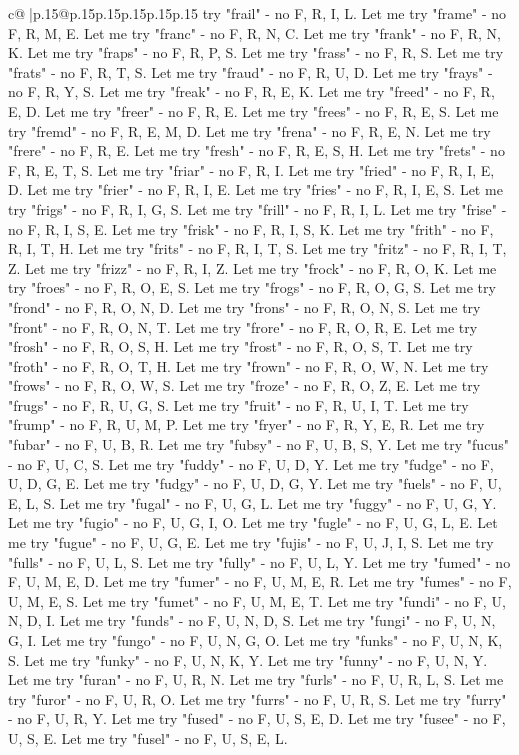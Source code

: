 \documentclass{article}
\begin{document}
{\begin{supertabular}{c@{$\;$}|p{.15\linewidth}@{}p{.15\linewidth}p{.15\linewidth}p{.15\linewidth}p{.15\linewidth}p{.15\linewidth}}
{{{try "frail" {-} no F, R, I, L. Let me try "frame" {-} no F, R, M, E. Let me try "franc" {-} no F, R, N, C. Let me try "frank" {-} no F, R, N, K. Let me try "fraps" {-} no F, R, P, S. Let me try "frass" {-} no F, R, S. Let me try "frats" {-} no F, R, T, S. Let me try "fraud" {-} no F, R, U, D. Let me try "frays" {-} no F, R, Y, S. Let me try "freak" {-} no F, R, E, K. Let me try "freed" {-} no F, R, E, D. Let me try "freer" {-} no F, R, E. Let me try "frees" {-} no F, R, E, S. Let me try "fremd" {-} no F, R, E, M, D. Let me try "frena" {-} no F, R, E, N. Let me try "frere" {-} no F, R, E. Let me try "fresh" {-} no F, R, E, S, H. Let me try "frets" {-} no F, R, E, T, S. Let me try "friar" {-} no F, R, I. Let me try "fried" {-} no F, R, I, E, D. Let me try "frier" {-} no F, R, I, E. Let me try "fries" {-} no F, R, I, E, S. Let me try "frigs" {-} no F, R, I, G, S. Let me try "frill" {-} no F, R, I, L. Let me try "frise" {-} no F, R, I, S, E. Let me try "frisk" {-} no F, R, I, S, K. Let me try "frith" {-} no F, R, I, T, H. Let me try "frits" {-} no F, R, I, T, S. Let me try "fritz" {-} no F, R, I, T, Z. Let me try "frizz" {-} no F, R, I, Z. Let me try "frock" {-} no F, R, O, K. Let me try "froes" {-} no F, R, O, E, S. Let me try "frogs" {-} no F, R, O, G, S. Let me try "frond" {-} no F, R, O, N, D. Let me try "frons" {-} no F, R, O, N, S. Let me try "front" {-} no F, R, O, N, T. Let me try "frore" {-} no F, R, O, R, E. Let me try "frosh" {-} no F, R, O, S, H. Let me try "frost" {-} no F, R, O, S, T. Let me try "froth" {-} no F, R, O, T, H. Let me try "frown" {-} no F, R, O, W, N. Let me try "frows" {-} no F, R, O, W, S. Let me try "froze" {-} no F, R, O, Z, E. Let me try "frugs" {-} no F, R, U, G, S. Let me try "fruit" {-} no F, R, U, I, T. Let me try "frump" {-} no F, R, U, M, P. Let me try "fryer" {-} no F, R, Y, E, R. Let me try "fubar" {-} no F, U, B, R. Let me try "fubsy" {-} no F, U, B, S, Y. Let me try "fucus" {-} no F, U, C, S. Let me try "fuddy" {-} no F, U, D, Y. Let me try "fudge" {-} no F, U, D, G, E. Let me try "fudgy" {-} no F, U, D, G, Y. Let me try "fuels" {-} no F, U, E, L, S. Let me try "fugal" {-} no F, U, G, L. Let me try "fuggy" {-} no F, U, G, Y. Let me try "fugio" {-} no F, U, G, I, O. Let me try "fugle" {-} no F, U, G, L, E. Let me try "fugue" {-} no F, U, G, E. Let me try "fujis" {-} no F, U, J, I, S. Let me try "fulls" {-} no F, U, L, S. Let me try "fully" {-} no F, U, L, Y. Let me try "fumed" {-} no F, U, M, E, D. Let me try "fumer" {-} no F, U, M, E, R. Let me try "fumes" {-} no F, U, M, E, S. Let me try "fumet" {-} no F, U, M, E, T. Let me try "fundi" {-} no F, U, N, D, I. Let me try "funds" {-} no F, U, N, D, S. Let me try "fungi" {-} no F, U, N, G, I. Let me try "fungo" {-} no F, U, N, G, O. Let me try "funks" {-} no F, U, N, K, S. Let me try "funky" {-} no F, U, N, K, Y. Let me try "funny" {-} no F, U, N, Y. Let me try "furan" {-} no F, U, R, N. Let me try "furls" {-} no F, U, R, L, S. Let me try "furor" {-} no F, U, R, O. Let me try "furrs" {-} no F, U, R, S. Let me try "furry" {-} no F, U, R, Y. Let me try "fused" {-} no F, U, S, E, D. Let me try "fusee" {-} no F, U, S, E. Let me try "fusel" {-} no F, U, S, E, L. }}}
\end{supertabular}}
\end{document}
